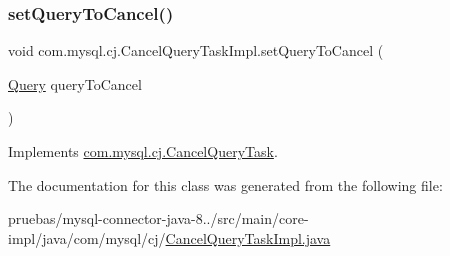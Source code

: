 \subsubsection{\texorpdfstring{set\+Query\+To\+Cancel()}{setQueryToCancel()}}
{\footnotesize\ttfamily void com.\+mysql.\+cj.\+Cancel\+Query\+Task\+Impl.\+set\+Query\+To\+Cancel (\begin{DoxyParamCaption}\item[{\mbox{\hyperlink{interfacecom_1_1mysql_1_1cj_1_1_query}{Query}}}]{query\+To\+Cancel }\end{DoxyParamCaption})}



Implements \mbox{\hyperlink{interfacecom_1_1mysql_1_1cj_1_1_cancel_query_task_ab9f6e0f8efcfd3f4b275bb1eb927b933}{com.\+mysql.\+cj.\+Cancel\+Query\+Task}}.



The documentation for this class was generated from the following file\+:\begin{DoxyCompactItemize}
\item 
pruebas/mysql-\/connector-\/java-\/8../src/main/core-\/impl/java/com/mysql/cj/\mbox{\hyperlink{_cancel_query_task_impl_8java}{Cancel\+Query\+Task\+Impl.\+java}}\end{DoxyCompactItemize}
